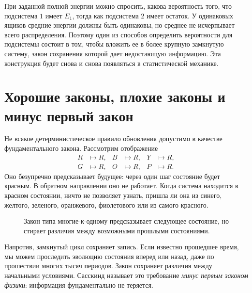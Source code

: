 При заданной полной энергии можно спросить, какова вероятность того, что подсистема \(1\) имеет \(E_1\), тогда как подсистема \(2\) имеет остаток. У одинаковых ящиков средние энергии должны быть одинаковы, но среднее не исчерпывает всего распределения. Поэтому один из способов определить вероятности для подсистемы состоит в том, чтобы вложить ее в более крупную замкнутую систему, закон сохранения которой дает недостающую информацию. Эта конструкция будет снова и снова появляться в статистической механике.

\section{Хорошие законы, плохие законы и минус первый закон}

Не всякое детерминистическое правило обновления допустимо в качестве фундаментального закона. Рассмотрим отображение
\begin{equation}
 \begin{aligned}
 R&\mapsto R,& B&\mapsto R,& Y&\mapsto R,\\
 G&\mapsto R,& O&\mapsto R,& P&\mapsto R.
 \end{aligned}
 \label{eq:sm1-all-to-red}
\end{equation}
Оно безупречно предсказывает будущее: через один шаг состояние будет красным. В обратном направлении оно не работает. Когда система находится в красном состоянии, ничто не позволяет узнать, пришла ли она из синего, желтого, зеленого, оранжевого, фиолетового или из самого красного.

\begin{figure}[htbp]
\centering
{}
\caption{Закон типа многие-к-одному предсказывает следующее состояние, но стирает различия между возможными прошлыми состояниями.}
\label{fig:sm1-bad-law}
\end{figure}

Напротив, замкнутый цикл сохраняет запись. Если известно прошедшее время, мы можем проследить эволюцию состояния вперед или назад, даже по прошествии многих тысяч периодов. Закон сохраняет различия между начальными условиями. Сасскинд называет это требование \emph{минус первым законом физики}: информация фундаментально не теряется.

